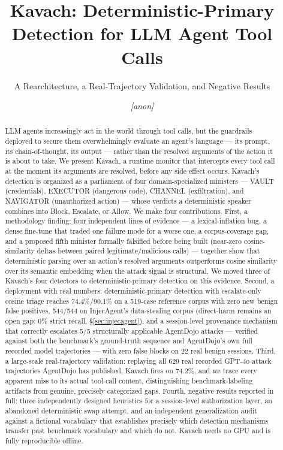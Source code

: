 \documentclass[sigconf,anonymous,review]{acmart}
\newcommand{\anonymise}[1]{\textit{[anon]}}
\begin{document}
\title{Kavach: Deterministic-Primary Detection for LLM Agent Tool Calls}
\subtitle{A Rearchitecture, a Real-Trajectory Validation, and Negative Results}

\author{\anonymise{Author One}}
\affiliation{\institution{\anonymise{PES University}}\country{\anonymise{India}}}

\begin{abstract}
LLM agents increasingly act in the world through tool calls, but the guardrails
deployed to secure them overwhelmingly evaluate an agent's language --- its
prompt, its chain-of-thought, its output --- rather than the resolved
arguments of the action it is about to take. We present Kavach, a runtime
monitor that intercepts every tool call at the moment its arguments are
resolved, before any side effect occurs. Kavach's detection is organized as a
parliament of four domain-specialized ministers --- VAULT (credentials),
EXECUTOR (dangerous code), CHANNEL (exfiltration), and NAVIGATOR (unauthorized
action) --- whose verdicts a deterministic speaker combines into Block,
Escalate, or Allow. We make four contributions. First, a
methodology finding: four independent lines of evidence --- a lexical-inflation
bug, a dense fine-tune that traded one failure mode for a worse one, a
corpus-coverage gap, and a proposed fifth minister formally falsified before
being built (near-zero cosine-similarity deltas between paired
legitimate/malicious calls) --- together show that deterministic parsing over
an action's resolved arguments outperforms cosine similarity over its semantic
embedding when the attack signal is structural. We moved three of Kavach's
four detectors to deterministic-primary detection on this evidence. Second, a
deployment with real numbers: deterministic-primary detection with
escalate-only cosine triage reaches 74.4\%/90.1\% on a 519-case reference
corpus with zero new benign false positives, 544/544 on InjecAgent's
data-stealing corpus (direct-harm remains an open gap: 0\% strict recall,
\S\ref{sec:injecagent}), and a
session-level provenance mechanism that correctly escalates 5/5 structurally
applicable AgentDojo attacks --- verified against both the benchmark's
ground-truth sequence and AgentDojo's own full recorded model
trajectories --- with zero false blocks on 22 real benign sessions. Third, a
large-scale real-trajectory validation: replaying all 629 real recorded GPT-4o
attack trajectories AgentDojo has published, Kavach fires on 74.2\%, and we
trace every apparent miss to its actual tool-call content, distinguishing
benchmark-labeling artifacts from
genuine, precisely categorized gaps. Fourth, negative results reported
in full: three independently designed heuristics for a session-level
authorization layer, an abandoned deterministic swap attempt, and an
independent generalization audit against a fictional vocabulary that
establishes precisely which detection mechanisms transfer past benchmark
vocabulary and which do not. Kavach needs no GPU and is fully reproducible
offline.
\end{abstract}
\end{document}

